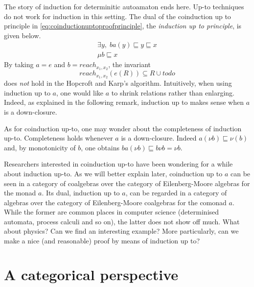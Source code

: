 \documentclass{llncs}
\begin{document}
The story of induction for determinitic autoamaton ends here. Up-to techniques do not work for induction in this setting. The dual of the coinduction up to principle in \eqref{eq:coinductionuptoproofprinciple}, the \emph{induction up to principle}, is given below.
\begin{equation}\label{eq:inductionuptoproofprinciple}
 \begin{array}{c}
    \exists y, \;  ba(y) \sqsubseteq y\sqsubseteq x \\
    \hline %
    \mu b \sqsubseteq x
\end{array}
\end{equation}
By taking $a=e$ and $b= reach_{x_1,x_2}$, the invariant 
$$reach_{x_1,x_2}(e(R)) \subseteq R\cup todo $$
does \emph{not} hold in the Hopcroft and Karp's algorithm. Intuitively, when using induction up to $a$, one would like $a$ to shrink relations rather than enlarging. Indeed, as explained in the following remark, induction up to makes sense when $a$ is a down-closure.
\begin{remark}
As for coinduction up-to, one may wonder about the completeness of induction up-to. Completeness holds whenever $a$ is a down-closure. Indeed $a(\nu b)\sqsubseteq \nu(b)$ and, by monotonicity of $b$, one obtains $ba(\nu b)\sqsubseteq b\nu b  = \nu b $.
\end{remark}

\begin{question}
Researchers interested in coinduction up-to have been wondering for a while about induction up-to. As we will better explain later, coinduction up to $a$ can be seen in a category of coalgebras over the category of Eilenberg-Moore algebras for the monad $a$. Its dual, induction up to $a$, can be regarded in a  category of algebras over the category of Eilenberg-Moore coalgebras for the comonad $a$. While the former are common places in computer science (determinised automata, process calculi and so on), the latter does not show off much. What about physics? Can we find an interesting example? More particularly, can we make a nice (and reasonable) proof by means of induction up to? 
\end{question}%

\section{A categorical perspective}
\end{document}
